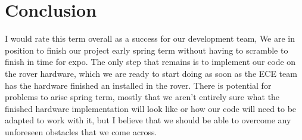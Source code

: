 \documentclass[10pt,letterpaper,onecolumn,draftclsnofoot,journal]{IEEEtran}
\begin{document}
\section{Conclusion}
I would rate this term overall as a success for our development team, We are in position to finish our project early spring term without having to scramble to finish in time for expo. The only step that remains is to implement our code on the rover hardware, which we are ready to start doing as soon as the ECE team has the hardware finished an installed in the rover. There is potential for problems to arise spring term, mostly that we aren't entirely sure what the finished hardware implementation will look like or how our code will need to be adapted to work with it, but I believe that we should be able to overcome any unforeseen obstacles that we come across.
\clearpage

\vspace{1in}
\end{document}
